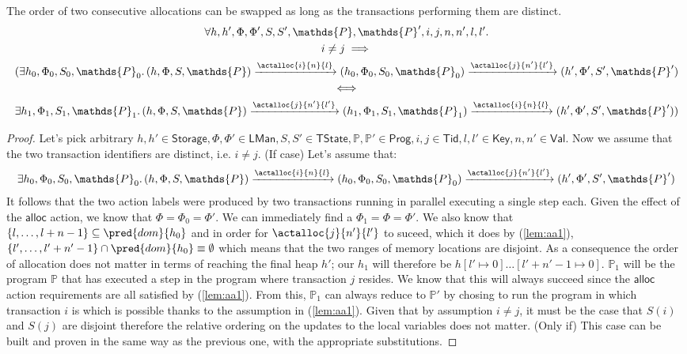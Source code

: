 \iffalse
\lem The order of two consecutive allocations can be swapped as long as the transactions performing them are distinct.
\begin{gather*}
	\forall h, h', \Phi, \Phi', S, S', \mathds{P}, \mathds{P}', i, j, n, n', l, l' \ldotp \\
	i \neq j \implies \\
	(\exists h_0, \Phi_0, S_0, \mathds{P}_0 \ldotp 
	(h, \Phi, S, \mathds{P}) \xrightarrow{\actalloc{i}{n}{l}} (h_0, \Phi_0, S_0, \mathds{P}_0)  \xrightarrow{\actalloc{j}{n'}{l'}} (h', \Phi', S', \mathds{P}') \\
	\iff \\
	\exists h_1, \Phi_1, S_1, \mathds{P}_1 \ldotp
	(h, \Phi, S, \mathds{P}) \xrightarrow{\actalloc{j}{n'}{l'}} (h_1, \Phi_1, S_1, \mathds{P}_1) \xrightarrow{\actalloc{i}{n}{l}} (h', \Phi', S', \mathds{P}'))
\end{gather*}
\begin{proof}
Let's pick arbitrary $h, h' \in \mathsf{Storage}, \Phi, \Phi' \in \mathsf{LMan}, S, S' \in \mathsf{TState}, \mathds{P}, \mathds{P}' \in \mathsf{Prog}, i, j \in \mathsf{Tid}, l, l' \in \mathsf{Key}, n, n' \in \mathsf{Val}$. Now we assume that the two transaction identifiers are distinct, i.e. $i \neq j$. (If case) Let's assume that:
\begin{gather} \label{lem:aa1}
	\exists h_0, \Phi_0, S_0, \mathds{P}_0 \ldotp 
	(h, \Phi, S, \mathds{P}) \xrightarrow{\actalloc{i}{n}{l}} (h_0, \Phi_0, S_0, \mathds{P}_0)  \xrightarrow{\actalloc{j}{n'}{l'}} (h', \Phi', S', \mathds{P}')
\end{gather}
It follows that the two action labels were produced by two transactions running in parallel executing a single step each. Given the effect of the $\mathsf{alloc}$ action, we know that $\Phi = \Phi_0 = \Phi'$. We can immediately find a $\Phi_1 = \Phi = \Phi'$. We also know that $\{l, \ldots, l + n - 1\} \subseteq \pred{dom}{h_0}$ and in order for $\actalloc{j}{n'}{l'}$ to suceed, which it does by (\ref{lem:aa1}), $\{l', \ldots, l' + n' - 1\} \cap \pred{dom}{h_0} \equiv \emptyset$ which means that the two ranges of memory locations are disjoint. As a consequence the order of allocation does not matter in terms of reaching the final heap $h'$; our $h_1$ will therefore be $h[l' \mapsto 0]\ldots[l' + n' - 1 \mapsto 0]$. $\mathds{P}_1$ will be the program $\mathds{P}$ that has executed a step in the program where transaction $j$ resides. We know that this will always succeed since the $\mathsf{alloc}$ action requirements are all satisfied by (\ref{lem:aa1}). From this, $\mathds{P}_1$ can always reduce to $\mathds{P}'$ by chosing to run the program in which transaction $i$ is which is possible thanks to the assumption in (\ref{lem:aa1}). Given that by assumption $i \neq j$, it must be the case that $S(i)$ and $S(j)$ are disjoint therefore the relative ordering on the updates to the local variables does not matter. (Only if) This case can be built and proven in the same way as the previous one, with the appropriate substitutions.
\end{proof}

